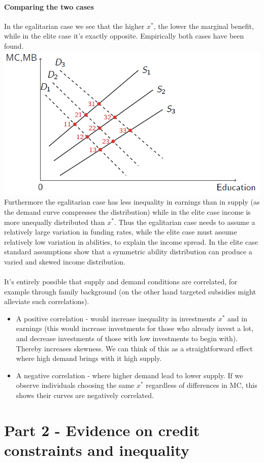 \documentclass[12pt, a4paper]{article}
\begin{document}
\begin{multicols}{2}
\paragraph{Comparing the two cases} 
In the egalitarian case we see that the higher $x^*$, the lower the marginal benefit, while in the elite case it's exactly opposite. Empirically both cases have been found. 
\includegraphics[width = 0.45 \textwidth]{comp.PNG}
Furthermore the egalitarian case has less inequality in earnings than in supply (as the demand curve compresses the distribution) while in the elite case income is more unequally distributed than $x^*$. Thus the egalitarian case needs to assume a relatively large variation in funding rates, while the elite case must assume relatively low variation in abilities, to explain the income spread. In the elite case standard assumptions show that a symmetric ability distribution can produce a varied and skewed income distribution.
\\ \\
It's entirely possible that supply and demand conditions are correlated, for example through family background (on the other hand targeted subsidies might alleviate such correlations).
\begin{itemize}
\item A positive correlation - would increase inequality in investments $x^*$ and in earnings (this would increase investments for those who already invest a lot, and decrease investments of those with low investments to begin with). Thereby increases skewness. We can think of this as a straightforward effect where high demand brings with it high supply.
\item A negative correlation - where higher demand lead to lower supply. If we observe individuals choosing the same $x^*$ regardless of differences in MC, this shows their curves are negatively correlated. 
\end{itemize}

\section{Part 2 - Evidence on credit constraints and inequality}

\end{multicols}
\end{document}
